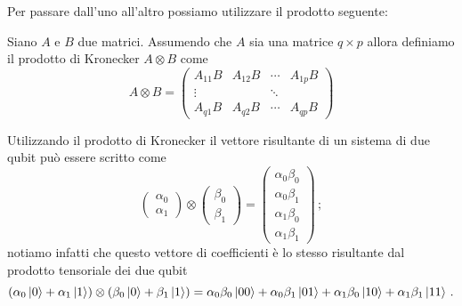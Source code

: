 \noindent Per passare dall'uno all'altro possiamo utilizzare il prodotto seguente:

\begin{definizione}
    Siano $A$ e $B$ due matrici. Assumendo che $A$ sia una matrice $q \times p$ allora definiamo il prodotto di Kronecker $A \otimes B$ come
    \begin{equation*}
        A \otimes B =
        \begin{pmatrix}
            A_{11} B & A_{12} B & \cdots & A_{1p} B \\ 
            \vdots & & \ddots & \\
            A_{q1} B & A_{q2} B & \cdots & A_{qp} B
        \end{pmatrix}
    \end{equation*}
\end{definizione}

\begin{esempio}
    Utilizzando il prodotto di Kronecker il vettore risultante di un sistema di due qubit può essere scritto come
    \begin{equation*}
        \begin{pmatrix}
            \alpha_0 \\ \alpha_1
        \end{pmatrix}
        \otimes
        \begin{pmatrix}
            \beta_0 \\ \beta_1
        \end{pmatrix}
        =
        \begin{pmatrix}
            \alpha_0 \beta_0 \\ \alpha_0 \beta_1 \\ \alpha_1 \beta_0 \\ \alpha_1 \beta_1
        \end{pmatrix} \, ;
    \end{equation*}
    notiamo infatti che questo vettore di coefficienti è lo stesso risultante dal prodotto tensoriale dei due qubit
    \begin{equation*}
        (\alpha_0 \ket{0} + \alpha_1 \ket{1}) \otimes (\beta_0 \ket{0} + \beta_1 \ket{1}) = \alpha_0 \beta_0 \ket{00} + \alpha_0 \beta_1 \ket{01} + \alpha_1 \beta_0 \ket{10} + \alpha_1 \beta_1 \ket{11} \, .
    \end{equation*}
\end{esempio}

